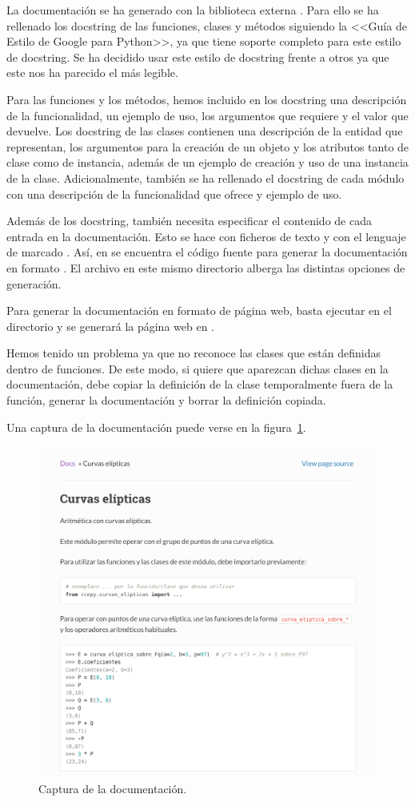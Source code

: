 La documentación se ha generado con la biblioteca externa . Para ello se ha rellenado los docstring de las funciones, clases y métodos siguiendo la <<Guía de Estilo de Google para Python>>, ya que  tiene soporte completo para este estilo de docstring. Se ha decidido usar este estilo de docstring frente a otros ya que este nos ha parecido el más legible.

Para las funciones y los métodos, hemos incluido en los docstring una descripción de la funcionalidad, un ejemplo de uso, los argumentos que requiere y el valor que devuelve. Los docstring de las clases contienen una descripción de la entidad que representan, los argumentos para la creación de un objeto y los atributos tanto de clase como de instancia, además de un ejemplo de creación y uso de una instancia de la clase. Adicionalmente, también se ha rellenado el docstring de cada módulo con una descripción de la funcionalidad que ofrece y ejemplo de uso.

Además de los docstring,  también necesita especificar el contenido de cada entrada en la documentación. Esto se hace con ficheros de texto y con el lenguaje de marcado . Así, en  se encuentra el código fuente para generar la documentación en formato . El archivo  en este mismo directorio alberga las distintas opciones de generación.

Para generar la documentación en formato de página web, basta ejecutar  en el directorio  y  se generará la página web en .

Hemos tenido un problema ya que  no reconoce las clases que están definidas dentro de funciones. De este modo, si quiere que aparezcan dichas clases en la documentación, debe copiar la definición de la clase temporalmente fuera de la función, generar la documentación y borrar la definición copiada.

Una captura de la documentación puede verse en la figura~\ref{fig:ejemplo_documentacion}.

\begin{figure}[h]
    \myfloatalign
    \includegraphics[scale=0.55]{Graficos/ejemplo_documentacion2}
    \caption{Captura de la documentación.}\label{fig:ejemplo_documentacion}
\end{figure}
